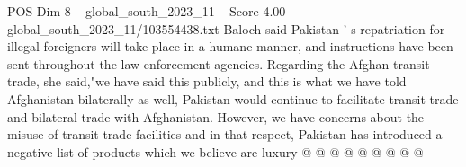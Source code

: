 \begin{textsample}{POS Dim 8 – global\_south\_2023\_11 – Score 4.00 – global\_south\_2023\_11/103554438.txt}
Baloch said Pakistan ' s repatriation for illegal foreigners will take place in a humane manner, and instructions have been sent throughout the law enforcement agencies.
Regarding the Afghan transit trade, she said,"we have said this publicly, and this is what we have told Afghanistan bilaterally as well, Pakistan would continue to facilitate transit trade and bilateral trade with Afghanistan.
However, we have concerns about the misuse of transit trade facilities and in that respect, Pakistan has introduced a negative list of products which we believe are luxury @ @ @ @ @ @ @ @ @

\end{textsample}
